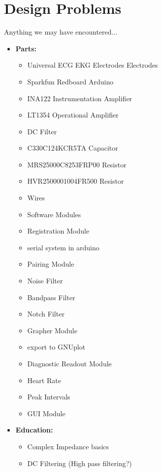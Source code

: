 \documentclass[11pt, oneside]{article}   	%
\begin{document}
\section{Design Problems}
Anything we may have encountered...
	\begin{itemize}[leftmargin=*]
		\item[] \textbf{Parts:}
			\begin{itemize} 
				\item Universal ECG EKG Electrodes Electrodes
				\item Sparkfun Redboard Arduino
				\item INA122 Instrumentation Amplifier
				\item LT1354 Operational Amplifier
				\begin{itemize}
				
				\end{itemize}
				\item DC Filter
					\item C330C124KCR5TA Capacitor
					\item MRS25000C8253FRP00 Resistor
					\item HVR2500001004FR500 Resistor
				\item Wires
				\item Software Modules
					\item Registration Module
						\item serial system in arduino
					\item Pairing Module
					\item Noise Filter
						\item Bandpass Filter
						\item Notch Filter
					\item Grapher Module
						\item export to GNUplot
					\item Diagnostic Readout Module
						\item Heart Rate
						\item Peak Intervals
					\item GUI Module
					
			\end{itemize}
		\item[] \textbf{Education:}
			\begin{itemize}
				\item Complex Impedance basics 
				\item DC Filtering (High pass filtering?)
			\end{itemize}
	\end{itemize}
\pagebreak
\end{document}
